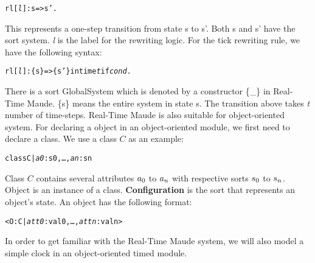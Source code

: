 \documentclass[a4paper,11pt]{report}
\begin{document}
\begin{alltt}   rl [\textit{l}] : s => s' .\end{alltt}
This represents a one-step transition from state s to s'. Both s and s' have the sort system. \textit{l} is the label for the rewriting logic. For the tick rewriting rule, we have the following syntax:
\begin{alltt}   rl [\textit{l}] : \{s\} => \{s'\} in time \textit{t} if \textit{cond} . \end{alltt}
There is a sort GlobalSystem which is denoted by a constructor \{\_\} in Real-Time Maude. \{s\} means the entire system in state s. The transition above takes \textit{t} number of time-steps. 
Real-Time Maude is also suitable for object-oriented system. For declaring a object in an object-oriented module, we first need to declare a class. We use a class $C$ as an example:

\begin{alltt}
   class C | \textit{a0}: s0, \ldots, \textit{an} : sn
\end{alltt}
Class $C$ contains several attributes $a\sb{0}$ to $a\sb{n}$ with respective sorts $s\sb{0}$ to $s\sb{n}$. 
\newline Object is an instance of a class. {\bf Configuration} is the sort that represents an object's state.  An object has the following format:
\begin{alltt}
   < O : C | \textit{att0} : val0, \ldots, \textit{attn} : valn >
\end{alltt}
In order to get familiar with the Real-Time Maude system, we will also model a simple clock in an object-oriented timed module.
\newpage
\end{document}
